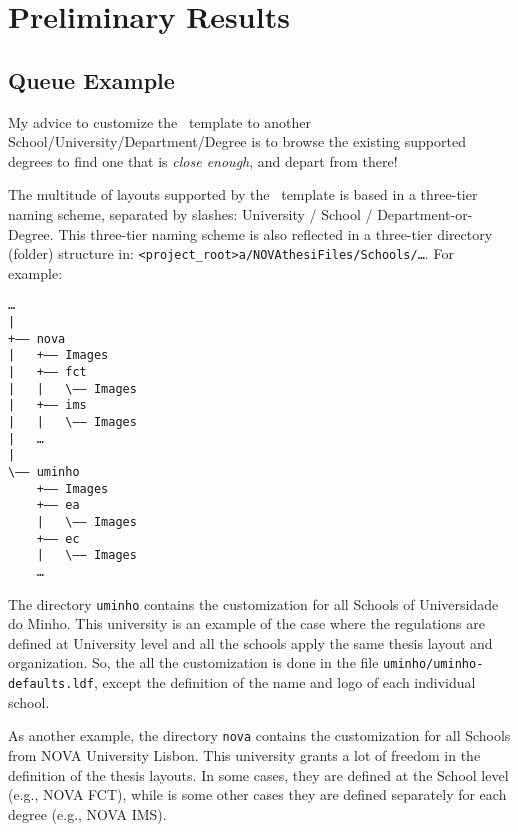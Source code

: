 
%

\chapter{Preliminary Results}
\label{cha:preliminary_results}

\section{Queue Example}
\label{sec:queue_example}

My advice to customize the \novathesis\ template to another School/University/Department/Degree is to browse the existing supported degrees to find one that is \emph{close enough}, and depart from there!

The multitude of layouts supported by the \novathesis\ template is based in a three-tier naming scheme, separated by slashes: University / School / Department-or-Degree.  This three-tier naming scheme is also reflected in a three-tier directory (folder) structure in: \verb!<project_root>a/NOVAthesiFiles/Schools/…!.  For example:

\begin{verbatim}
…
| 
+—— nova
|   +—— Images
|   +—— fct
|   |   \—— Images
|   +—— ims
|   |   \—— Images
|   …
|   
\—— uminho
    +—— Images
    +—— ea
    |   \—— Images
    +—— ec
    |   \—— Images
    …
\end{verbatim}

The directory \verb!uminho! contains the customization for all Schools of Universidade do Minho.  This university is an example of the case where the regulations are defined at University level and all the schools apply the same thesis layout and organization.  So, the all the customization is done in the file \verb!uminho/uminho-defaults.ldf!, except the definition of the name and logo of each individual school.

As another example, the directory \verb!nova! contains the customization for all Schools from NOVA University Lisbon. This university grants a lot of freedom in the definition of the thesis layouts.  In some cases, they are defined at the School level (e.g., NOVA FCT), while is some other cases they are defined separately for each degree (e.g., NOVA IMS).




